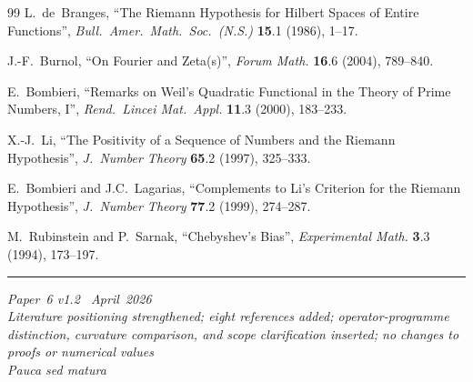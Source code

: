 \documentclass[11pt]{article}
\begin{document}
\begin{thebibliography}{99}
L.~de~Branges,
``The Riemann Hypothesis for Hilbert Spaces of Entire Functions'',
\emph{Bull.\ Amer.\ Math.\ Soc.\ (N.S.)} \textbf{15}.1 (1986),
1--17.

J.-F.~Burnol,
``On Fourier and Zeta(s)'',
\emph{Forum Math.} \textbf{16}.6 (2004), 789--840.

E.~Bombieri,
``Remarks on Weil's Quadratic Functional in the Theory of Prime
Numbers, I'',
\emph{Rend.\ Lincei Mat.\ Appl.} \textbf{11}.3 (2000), 183--233.

X.-J.~Li,
``The Positivity of a Sequence of Numbers and the Riemann
Hypothesis'',
\emph{J.\ Number Theory} \textbf{65}.2 (1997), 325--333.

E.~Bombieri and J.C.~Lagarias,
``Complements to Li's Criterion for the Riemann Hypothesis'',
\emph{J.\ Number Theory} \textbf{77}.2 (1999), 274--287.

M.~Rubinstein and P.~Sarnak,
``Chebyshev's Bias'',
\emph{Experimental Math.} \textbf{3}.3 (1994), 173--197.

\end{thebibliography}

\bigskip\noindent\rule{\linewidth}{0.4pt}\par\smallskip
\noindent\small
\emph{Paper~6 v1.2 \textperiodcentered\ April~2026}\\
\emph{Literature positioning strengthened; eight references added;
operator-programme distinction, curvature comparison, and scope
clarification inserted; no changes to proofs or numerical values}\\
\emph{Pauca sed matura}
\end{document}
